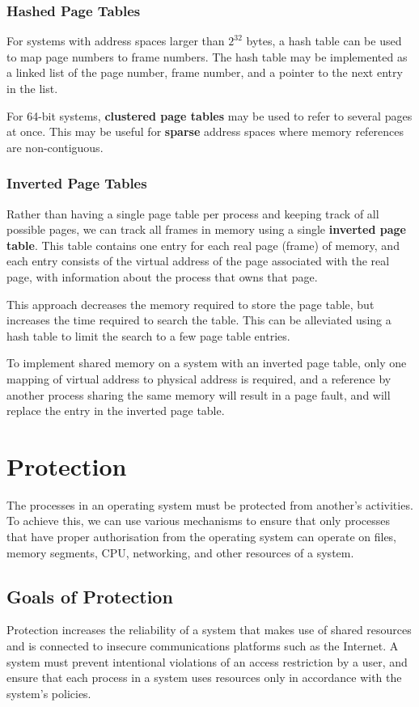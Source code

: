 \documentclass{article}
\begin{document}
\subsubsection{Hashed Page Tables}
For systems with address spaces larger than \(2^{32}\) bytes, a hash
table can be used to map page numbers to frame numbers. The hash table
may be implemented as a linked list of the page number, frame number,
and a pointer to the next entry in the list.

For 64-bit systems, \textbf{clustered page tables} may be used to refer
to several pages at once. This may be useful for \textbf{sparse}
address spaces where memory references are non-contiguous.
\subsubsection{Inverted Page Tables}
Rather than having a single page table per process and keeping track of all
possible pages, we can track all frames in memory using a single
\textbf{inverted page table}. This table contains one entry for each
real page (frame) of memory, and each entry consists of the virtual
address of the page associated with the real page, with information
about the process that owns that page.

This approach decreases the memory required to store the page table,
but increases the time required to search the table. This can be alleviated
using a hash table to limit the search to a few page table entries.

To implement shared memory on a system with an inverted page table, only
one mapping of virtual address to physical address is required, and
a reference by another process sharing the same memory will result in a
page fault, and will replace the entry in the inverted page table.
\section{Protection}
The processes in an operating system must be protected from another's
activities. To achieve this, we can use various mechanisms to ensure
that only processes that have proper authorisation from the operating
system can operate on files, memory segments, CPU, networking, and
other resources of a system.
\subsection{Goals of Protection}
Protection increases the reliability of a system that makes use of
shared resources and is connected to insecure communications platforms
such as the Internet. A system must prevent intentional violations of an
access restriction by a user, and ensure that each process in a system
uses resources only in accordance with the system's policies.
\end{document}
